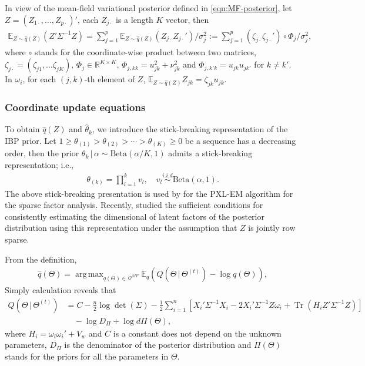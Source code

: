 \documentclass[pdftex]{imsart}
\DeclareMathOperator{\Tr}{Tr}
\DeclareMathOperator*{\argmax}{arg\,max}
\newcommand{\given}{\,|\,}
\theoremstyle{plain}
\begin{document}
In view of the mean-field variational posterior defined in \eqref{eqn:MF-posterior}, 
let $Z = (Z_{1 \cdot}, \dots, Z_{p \cdot})'$, each $Z_{j \cdot}$ is a length $K$ vector, then
\begin{align}
\label{second-moment}
\mathbb{E}_{Z \sim \hat q(Z)} (Z' \Sigma^{-1} Z) 
= \sum_{j=1}^p \mathbb{E}_{Z \sim \hat q(Z)} (Z_{j\cdot}Z_{j\cdot}') /\sigma_j^2
:= \sum_{j=1}^p (\zeta_{j\cdot} \zeta_{j \cdot}') \circ \Phi_j/\sigma_j^2,
\end{align}
where $\circ$ stands for the coordinate-wise product between two matrices, $\zeta_{j \cdot} = (\zeta_{j1}, \dots \zeta_{jK})$, $\Phi_{j} \in \mathbb{R}^{K \times K}$, $\Phi_{j, kk} = u_{jk}^2 + \nu_{jk}^2$ and $\Phi_{j, k'k} = u_{jk}u_{jk'}$ for $k \neq k'$.
In $\omega_i$, for each $(j,k)$-th element of $Z$, $\mathbb{E}_{Z \sim \hat q(Z)} Z_{jk} = \zeta_{jk} u_{jk}$.


\subsubsection{Coordinate update equations}

To obtain $\hat q(Z)$ and $\hat \theta_k$, we introduce the stick-breaking representation of the IBP prior. Let $1 \geq \theta_{(1)} > \theta_{(2)} > \cdots > \theta_{(K)} \geq 0$ be a sequence has a decreasing order, then the prior $\theta_k \given \alpha \sim \text{Beta}(\alpha/K, 1)$ admits a stick-breaking representation; i.e.,
\begin{align}
\label{stickbreaking-ibp}
\theta_{(k)} = \prod_{l=1}^k v_l,
\quad 
v_l \stackrel{i.i.d}{\sim} \text{Beta}(\alpha, 1). 
\end{align}
The above stick-breaking presentation is used by \citet{rockova16} for the PXL-EM algorithm for the sparse factor analysis. Recently, \citet{ohn22} studied the sufficient conditions for consistently estimating the dimensional of latent factors of the posterior distribution using this representation under the assumption that $Z$ is jointly row sparse. 

From the definition, 
\begin{align}
\label{cavi-Theta}
\hat q(\Theta) = \argmax_{q(\Theta) \in \mathcal{Q}^{MF}} 
\mathbb{E}_q \left(Q(\Theta \given \Theta^{(t)}) - \log q(\Theta)\right),
\end{align}
Simply calculation reveals that
\begin{equation}
\label{eqn:Q}
\begin{split}
Q(\Theta \given \Theta^{(t)})
& = C - \frac{n}{2}\log \det(\Sigma)
- \frac{1}{2} \sum_{i=1}^n \left[
X_i' \Sigma^{-1} X_i 
- 2 X_i'\Sigma^{-1} Z \omega_i
+\Tr(H_i Z' \Sigma^{-1} Z) \right] \\
& \quad - \log D_\Pi + \log d\Pi(\Theta),
\end{split}
\end{equation}
where $H_i = \omega_i \omega_i' + V_w$ and $C$ is a constant does not depend on the unknown parameters, $D_\Pi$ is the denominator of the posterior distribution and $\Pi(\Theta)$ stands for the priors for all the parameters in $\Theta$. 
\end{document}
